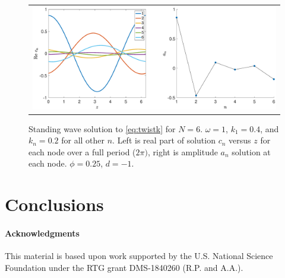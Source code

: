 \documentclass[12pt]{article}
\begin{document}
\begin{figure}[H]
\begin{center}
\begin{tabular}{c}
\includegraphics[width=15cm]{images/even6assym.eps}
\end{tabular}
\end{center}
\caption{Standing wave solution to \cref{eq:twistk} for $N = 6$. $\omega = 1$, $k_1 = 0.4$, and $k_n = 0.2$ for all other $n$. Left is real part of solution $c_n$ versus $z$ for each node over a full period ($2 \pi)$, right is amplitude $a_n$ solution at each node. $\phi = 0.25$, $d=-1$.}
\label{fig:even6assym}
\end{figure}


\section{Conclusions}

\paragraph{Acknowledgments}

This material is based upon work supported by the U.S. National Science Foundation under the RTG grant DMS-1840260 (R.P. and A.A.).



\end{document}
